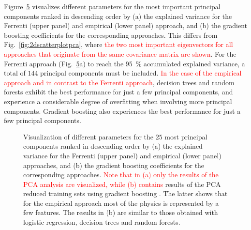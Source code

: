 \documentclass[superscriptaddress,unsortedaddress,
 amsmath,amssymb,
 aps,
]{revtex4-2}
\newcommand{\mrk}[1]{\textcolor{red}{#1}}
\begin{document}
Figure~\ref{fig:PComponents} visualizes different parameters for the most important principal components ranked in descending order by (a) the explained variance for the Ferrenti (upper panel) and empirical (lower panel) approach, and (b) the gradient boosting coefficients for the corresponding approaches. This differs from Fig.~\ref{fig:2dscatterplotpca}, where \mrk{the two most important eigenvectors for all approaches that originate from the same covariance matrix are shown}. 
For the Ferrenti approach (Fig.~\ref{fig:PComponents}a) to reach the \SI{95}{\percent} accumulated explained variance, a total of $144$ principal components must be included. \mrk{In the case of the empirical approach and in contrast to the Ferrenti approach}, decision trees and random forests exhibit the best performance for just a few principal components, and experience a considerable degree of overfitting when involving more principal components. Gradient boosting 
also experiences the best performance for just a few principal components. 

\begin{figure}[t]
    \centering
    \begin{subfigure}[b]{0.45\textwidth}
        
        \label{fig:01-fi-e}
    \end{subfigure}
    \begin{subfigure}[b]{0.45\textwidth}
        
        \label{fig:01-fi-d}
    \end{subfigure}%
    \hfill
    \begin{subfigure}[b]{0.45\textwidth}
        
        \label{fig:03-fi-e}
        \subcaption{}
    \end{subfigure}
    \begin{subfigure}[b]{0.45\textwidth}
        
        \label{fig:03-fi-d}
        \subcaption{}
    \end{subfigure}
    \caption{Visualization of different parameters for the $25$ most principal components ranked in descending order by (a) the explained variance for the Ferrenti (upper panel) and empirical (lower panel) approaches, and (b) the gradient boosting coefficients for the corresponding approaches. \mrk{Note that in (a) only the results of the PCA analysis are visualized, while (b) contains} results of the PCA reduced training sets using gradient boosting \cite{Hastie2009,xgboost2016}. The latter shows that for the empirical approach most of the physics is represented by a few features. The results in (b) are similar to those obtained with logistic regression, decision trees and random forests.  
    }
    \label{fig:PComponents}
\end{figure}
\end{document}
